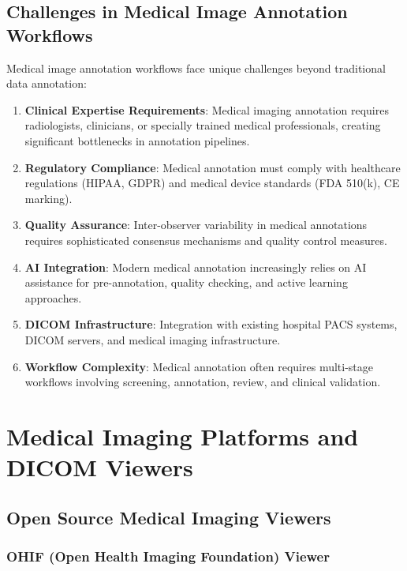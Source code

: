 \subsection{Challenges in Medical Image Annotation Workflows}

Medical image annotation workflows face unique challenges beyond traditional data annotation:

\begin{enumerate}
    \item \textbf{Clinical Expertise Requirements}: Medical imaging annotation requires radiologists, clinicians, or specially trained medical professionals, creating significant bottlenecks in annotation pipelines.
    
    \item \textbf{Regulatory Compliance}: Medical annotation must comply with healthcare regulations (HIPAA, GDPR) and medical device standards (FDA 510(k), CE marking).
    
    \item \textbf{Quality Assurance}: Inter-observer variability in medical annotations requires sophisticated consensus mechanisms and quality control measures.
    
    \item \textbf{AI Integration}: Modern medical annotation increasingly relies on AI assistance for pre-annotation, quality checking, and active learning approaches.
    
    \item \textbf{DICOM Infrastructure}: Integration with existing hospital PACS systems, DICOM servers, and medical imaging infrastructure.
    
    \item \textbf{Workflow Complexity}: Medical annotation often requires multi-stage workflows involving screening, annotation, review, and clinical validation.
\end{enumerate}

\section{Medical Imaging Platforms and DICOM Viewers}
\label{sec:medical-platforms}

\subsection{Open Source Medical Imaging Viewers}

\subsubsection{OHIF (Open Health Imaging Foundation) Viewer}

